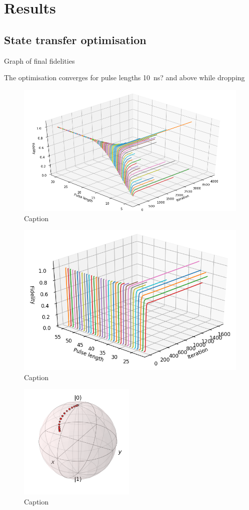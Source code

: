 \documentclass[main.tex]{subfiles}
\begin{document}
\chapter{Results}

\section{State transfer optimisation}
Graph of final fidelities

The optimisation converges for pulse lengths \SI{10}{\nano\second}? and above while dropping 

\begin{figure}
    \centering
    \includegraphics[width=\linewidth]{../figs/3d-optim-ge.png}
    \caption{Caption}
    \label{fig:3d-optim-ge}
\end{figure}

\begin{figure}
    \centering
    \includegraphics[width=0.7\linewidth]{../figs/3d-optim-gf.png}
    \caption{Caption}
    \label{fig:3d-optim-gf}
\end{figure}



\begin{figure}
    \centering
    \includegraphics[width=15em]{../figs/bloch_evolution_4,25.png}
    \caption{Caption}
    \label{fig:my_label}
\end{figure}
\end{document}
